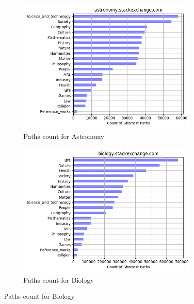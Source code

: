 
 \begin{figure}[H]
    \centering
    \begin{subfigure}{0.5\textwidth}
    \centering
        \includegraphics[width=1\linewidth]{imgs/path-counts/astronomy_stackexchange_com}
        \caption{Paths count for Astronomy}
        \label{fig:path-count-astronomy}
    \end{subfigure}%
    \begin{subfigure}{0.5\textwidth}
    \centering
        \includegraphics[width=1\linewidth]{imgs/path-counts/biology_stackexchange_com}
        \caption{Paths count for Biology}
        \label{fig:path-count-biology}
    \end{subfigure}
 

\end{figure}
